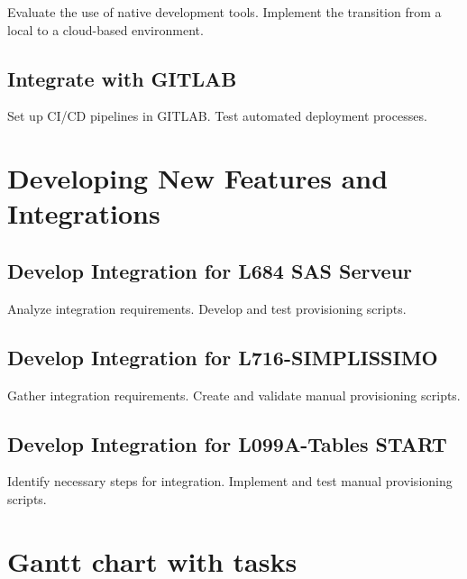 Evaluate the use of native development tools.
Implement the transition from a local to a cloud-based environment.


\subsection{Integrate with GITLAB}

Set up CI/CD pipelines in GITLAB.
Test automated deployment processes.


\section{Developing New Features and Integrations}

\subsection{Develop Integration for L684 SAS Serveur}

Analyze integration requirements.
Develop and test provisioning scripts.


\subsection{Develop Integration for L716-SIMPLISSIMO}

Gather integration requirements.
Create and validate manual provisioning scripts.


\subsection{Develop Integration for L099A-Tables START}

Identify necessary steps for integration.
Implement and test manual provisioning scripts.


\section{Gantt chart with tasks}


